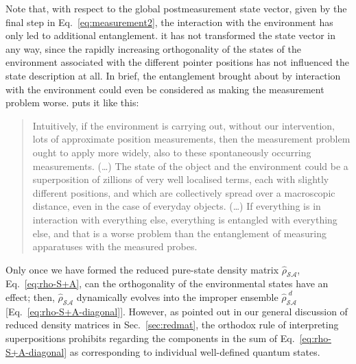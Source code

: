 \documentclass[twocolumn,rmp,aps,amsmath,amsfonts,noshowkeys,noshowpacs]{revtex4}
\begin{document}
Note that, with respect to the global postmeasurement state vector,
given by the final step in Eq.~\eqref{eq:measurement2}, the
interaction with the environment has only led to additional
entanglement. it has not transformed the state vector in any way,
since the rapidly increasing orthogonality of the states of the
environment associated with the different pointer positions has not
influenced the state description at all. In brief, the entanglement
brought about by interaction with the environment could even be
considered as making the measurement problem worse.
\citet[Sec.~3.2]{Bacciagaluppi:2003:yz} puts it like this:
%
\begin{quote} {\small 
    Intuitively, if the environment is carrying out, without our
    intervention, lots of approximate position measurements, then the
    measurement problem ought to apply more widely, also to these
    spontaneously occurring measurements. (\dots) The state of the
    object and the environment could be a superposition of zillions of
    very well localised terms, each with slightly different positions,
    and which are collectively spread over a macroscopic distance,
    even in the case of everyday objects.  (\dots) If everything is in
    interaction with everything else, everything is entangled with
    everything else, and that is a worse problem than the entanglement
    of measuring apparatuses with the measured probes.
}\end{quote}
%
Only once we have formed the reduced pure-state density matrix
$\widehat{\rho}_\mathcal{SA}$, Eq.~\eqref{eq:rho-S+A}, can the
orthogonality of the environmental states have an effect; then,
$\widehat{\rho}_\mathcal{SA}$ dynamically evolves into the improper
ensemble $\widehat{\rho}_\mathcal{SA}^{\,\,d}$
[Eq.~\eqref{eq:rho-S+A-diagonal}]. However, as pointed out in our
general discussion of reduced density matrices in
Sec.~\ref{sec:redmat}, the orthodox rule of interpreting
superpositions prohibits regarding the components in the sum of
Eq.~\eqref{eq:rho-S+A-diagonal} as corresponding to individual
well-defined quantum states.
\end{document}

